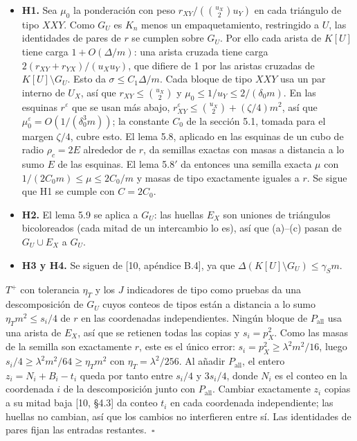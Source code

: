 \documentclass[spanish,11pt,a4paper]{article}
\providecommand{\tightlist}{\setlength{\itemsep}{0pt}\setlength{\parskip}{0pt}}
\begin{document}
\begin{itemize}
\tightlist
\item
  \textbf{H1.} Sea \(\mu_0\) la ponderación con peso \(r_{XY}/(\binom{u_X}{2}u_Y)\) en cada triángulo de tipo \(XXY\). Como \(G_U\) es \(K_n\) menos un empaquetamiento, restringido a \(U\), las identidades de pares de \(r\) se cumplen sobre \(G_U\). Por ello cada arista de \(K[U]\) tiene carga \(1+O(\Delta/m)\): una arista cruzada tiene carga \(2(r_{XY}+r_{YX})/(u_Xu_Y)\), que difiere de 1 por las aristas cruzadas de \(K[U]\setminus G_U\). Esto da \(\sigma\le C_1\Delta/m\). Cada bloque de tipo \(XXY\) usa un par interno de \(U_X\), así que \(r_{XY}\le\binom{u_X}{2}\) y \(\mu_0\le1/u_Y\le2/(\delta_0m)\). En las esquinas \(r^\varepsilon\) que se usan más abajo, \(r^\varepsilon_{XY}\le\binom{u_X}{2}+(\zeta/4)m^2\), así que \(\mu_0^\varepsilon=O(1/(\delta_0^3m))\); la constante \(C_0\) de la sección 5.1, tomada para el margen \(\zeta/4\), cubre esto. El lema 5.8, aplicado en las esquinas de un cubo de radio \(\rho_c=2E\) alrededor de \(r\), da semillas exactas con masas a distancia a lo sumo \(E\) de las esquinas. El lema 5.8\('\) da entonces una semilla exacta \(\mu\) con \(1/(2C_0m)\le\mu\le2C_0/m\) y masas de tipo exactamente iguales a \(r\). Se sigue que H1 se cumple con \(C=2C_0\).
\item
  \textbf{H2.} El lema 5.9 se aplica a \(G_U\): las huellas \(E_X\) son uniones de triángulos bicoloreados (cada mitad de un intercambio lo es), así que (a)--(c) pasan de \(G_U\cup E_X\) a \(G_U\).
\item
  \textbf{H3 y H4.} Se siguen de {[}10, apéndice B.4{]}, ya que \(\Delta(K[U]\setminus G_U)\le\gamma_Sm\).
\end{itemize}

\(T^+\) con tolerancia \(\eta_T\) y los \(J\) indicadores de tipo como pruebas da una descomposición de \(G_U\) cuyos conteos de tipos están a distancia a lo sumo \(\eta_Tm^2\le s_i/4\) de \(r\) en las coordenadas independientes. Ningún bloque de \(P_{\mathrm{all}}\) usa una arista de \(E_X\), así que se retienen todas las copias y \(s_i=p_X^2\). Como las masas de la semilla son exactamente \(r\), este es el único error: \(s_i=p_X^2\ge\lambda^2m^2/16\), luego \(s_i/4\ge\lambda^2m^2/64\ge\eta_Tm^2\) con \(\eta_T=\lambda^2/256\). Al añadir \(P_{\mathrm{all}}\), el entero \(z_i=N_i+B_i-t_i\) queda por tanto entre \(s_i/4\) y \(3s_i/4\), donde \(N_i\) es el conteo en la coordenada \(i\) de la descomposición junto con \(P_{\mathrm{all}}\). Cambiar exactamente \(z_i\) copias a su mitad baja {[}10, §4.3{]} da conteo \(t_i\) en cada coordenada independiente; las huellas no cambian, así que los cambios no interfieren entre sí. Las identidades de pares fijan las entradas restantes.~\(\square\)
\end{document}
